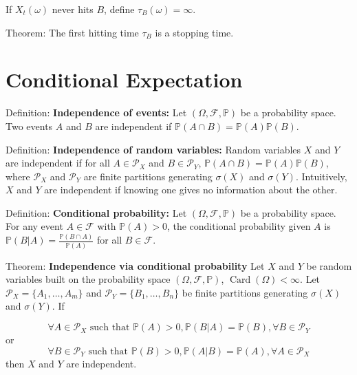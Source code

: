 \documentclass[12pt,a4paper]{article}
\begin{document}
If $X_t(\omega)$ never hits $B$, define $\tau_B(\omega) = \infty$.
\vspace{1em}

Theorem: The first hitting time $\tau_B$ is a stopping time.
\vspace{1em}





\section{Conditional Expectation}

Definition: \textbf{Independence of events:}
Let $(\Omega, \mathcal{F}, \mathbb{P})$ be a probability space. Two events $A$ and $B$ are independent if $\mathbb{P}(A \cap B) = \mathbb{P}(A)\mathbb{P}(B)$.
\vspace{1em}

Definition: \textbf{Independence of random variables:}
Random variables $X$ and $Y$ are independent if for all $A \in \mathcal{P}_X$ and $B \in \mathcal{P}_Y$, $\mathbb{P}(A \cap B) = \mathbb{P}(A)\mathbb{P}(B)$, where $\mathcal{P}_X$ and $\mathcal{P}_Y$ are finite partitions generating $\sigma(X)$ and $\sigma(Y)$. Intuitively, $X$ and $Y$ are independent if knowing one gives no information about the other.
\vspace{1em}

Definition: \textbf{Conditional probability:}
Let $(\Omega, \mathcal{F}, \mathbb{P})$ be a probability space. For any event $A \in \mathcal{F}$ with $\mathbb{P}(A) > 0$, the conditional probability given $A$ is
$\mathbb{P}(B|A) = \frac{\mathbb{P}(B \cap A)}{\mathbb{P}(A)}$ for all $B \in \mathcal{F}$.
\vspace{1em}


Theorem: \textbf{Independence via conditional probability}
\vspace{0.5em}
Let $X$ and $Y$ be random variables built on the probability space $(\Omega, \mathcal{F}, \mathbb{P})$, $\operatorname{Card}(\Omega) < \infty$. Let $\mathcal{P}_X = \{A_1, \ldots, A_m\}$ and $\mathcal{P}_Y = \{B_1, \ldots, B_n\}$ be finite partitions generating $\sigma(X)$ and $\sigma(Y)$. If

\[ \forall A \in \mathcal{P}_X \text{ such that } \mathbb{P}(A) > 0, \mathbb{P}(B|A) = \mathbb{P}(B), \forall B \in \mathcal{P}_Y \]
or
\[ \forall B \in \mathcal{P}_Y \text{ such that } \mathbb{P}(B) > 0, \mathbb{P}(A|B) = \mathbb{P}(A), \forall A \in \mathcal{P}_X \]
then $X$ and $Y$ are independent.
\vspace{1em}
\end{document}
